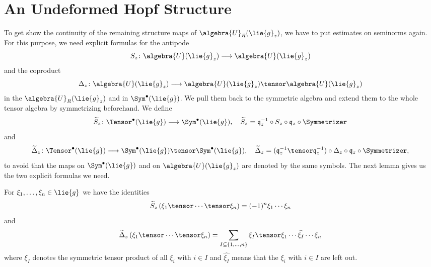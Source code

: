 \section{An Undeformed Hopf Structure}

To get show the continuity of the remaining structure maps of 
$\algebra{U}_R(\lie{g}_z)$, we have to put estimates on seminorms again. For this 
purpose, we need explicit formulas for the antipode
\begin{equation}
    \label{eq:Antipode}
    S_z \colon
    \algebra{U}(\lie{g}_z)
    \longrightarrow
    \algebra{U}(\lie{g}_z)
\end{equation}
and the coproduct
\begin{equation}
    \label{eq:CoProduct}
    \coproduct_z \colon
    \algebra{U}(\lie{g}_z)
    \longrightarrow
    \algebra{U}(\lie{g}_z)
    \tensor
    \algebra{U}(\lie{g}_z)
\end{equation}
in the $\algebra{U}_R(\lie{g}_z)$ and in $\Sym^{\bullet}(\lie{g})$. We pull them 
back to the symmetric algebra and extend them to the whole tensor algebra by 
symmetrizing beforehand. We define
\begin{equation}
    \label{eq:AntipodeOnTensor}
    \widetilde{S}_z \colon
    \Tensor^\bullet(\lie{g})
    \longrightarrow
    \Sym^\bullet(\lie{g})
    , \quad
    \widetilde{S}_z
    =
    \mathfrak{q}_z^{-1}
    \circ
    S_z
    \circ
    \mathfrak{q}_z
    \circ
    \Symmetrizer
\end{equation}
and
\begin{equation}
    \label{eq:CoProductOnTensor}
    \widetilde{\ocoproduct}_z \colon
    \Tensor^\bullet(\lie{g})
    \longrightarrow
    \Sym^\bullet(\lie{g})
    \tensor
    \Sym^\bullet(\lie{g})
    , \quad
    \widetilde{\ocoproduct}_z
    =
    (\mathfrak{q}_z^{-1} \tensor \mathfrak{q}_z^{-1})
    \circ
    \coproduct_z
    \circ
    \mathfrak{q}_z
    \circ
    \Symmetrizer,
\end{equation}
to avoid that the maps on $\Sym^{\bullet}(\lie{g})$ and on $\algebra{U}
(\lie{g}_z)$ are denoted by the same symbols. The next lemma gives us the two 
explicit formulas we need.
\begin{lemma}
    \label{Thm:Hopf:Formulas}%
    For $\xi_1, \ldots, \xi_n \in \lie{g}$ we have the identities
    \begin{equation}
        \label{Hopf:AntipodeFormula}
        \widetilde{S}_z
        \left( \xi_1 \tensor \cdots \tensor \xi_n \right)
        =
        (-1)^n
        \xi_1 \cdots \xi_n
    \end{equation}
    and
    \begin{equation}
        \label{Hopf:CoproductFormula}
        \widetilde{\ocoproduct}_z
        \left(\xi_1 \tensor \cdots \tensor \xi_n \right)
        =
        \sum\limits_{
        	I \subseteq
        	\{1, \ldots, n\}
        }
        \xi_I
        \tensor
        \xi_1 \cdots
        \widehat{\xi_I}
        \cdots \xi_n
    \end{equation}
    where $\xi_I$ denotes the symmetric tensor product of all $\xi_i$ with 
    $i \in I$ and $\widehat{\xi_I}$ means that the $\xi_i$ with $i \in I$ 
    are left out.
\end{lemma}
